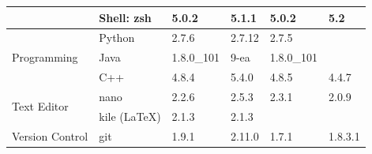 \begin{table}[!ht]
{\begin{tabular}{ll|l|l|l|l|}
\multicolumn{1}{|l}{}                                  & \multicolumn{1}{|l|}{Shell: zsh}             & 5.0.2                                                               & 5.1.1                                                             & 5.0.2                                                                  & 5.2                                                         \\ \hline
\multicolumn{1}{|l}{\multirow{3}{*}{Programming}}      & \multicolumn{1}{|l|}{Python}                 & 2.7.6                                                               & 2.7.12                                                            & 2.7.5                                                                  &                                                             \\ \cline{2-6}
\multicolumn{1}{|l}{}                                  & \multicolumn{1}{|l|}{Java}                   & 1.8.0\_101                                                          & 9-ea                                                              & 1.8.0\_101                                                             &                                                             \\ \cline{2-6}
\multicolumn{1}{|l}{}                                  & \multicolumn{1}{|l|}{C++}                    & 4.8.4                                                               & 5.4.0                                                             & 4.8.5                                                                  & 4.4.7                                                       \\ \hline
\multicolumn{1}{|l}{\multirow{2}{*}{Text Editor}}      & \multicolumn{1}{|l|}{nano}                   & 2.2.6                                                               & 2.5.3                                                             & 2.3.1                                                                  & 2.0.9                                                       \\ \cline{2-6}
\multicolumn{1}{|l}{}                                  & \multicolumn{1}{|l|}{kile (\LaTeX)}          & 2.1.3                                                               & 2.1.3                                                             &                                                                        &                                                             \\ \hline
\multicolumn{1}{|l}{Version Control}                   & \multicolumn{1}{|l|}{git}                    & 1.9.1                                                               & 2.11.0                                                            & 1.7.1                                                                  & 1.8.3.1                                                     \\ \hline

\end{tabular}}
\end{table}
